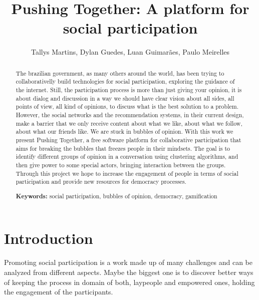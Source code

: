 \documentclass{llncs}
\begin{document}
\sloppy
\title{Pushing Together: A platform for social participation}

\author{Tallys Martins, Dylan Guedes,
        Luan Guimarães, Paulo Meirelles}


\maketitle
\begin{abstract}
  The brazilian government, as many others around the world, has been trying to
  collaborativelly build technologies for social participation, exploring
  the guidance of the internet.
  Still, the participation process is more than just giving your opinion, it is
  about dialog and discussion in a way we should have clear vision about all sides,
  all points of view, all kind of opinions, to discuss what is the best solution
  to a problem. However, the social networks and the recommendation systems, in their
  current design, make a barrier that we only receive content about
  what we like, about what we follow, about what our friends like. We are 
  stuck in bubbles of opinion.
  With this work we present Pushing Together, a free software platform
  for collaborative participation that aims for breaking the bubbles that
  freezes people in their mindsets. The goal is to identify different groups of
  opinion in a conversation using clustering algorithms, and then give power to some
  special actors, bringing interaction between the groups.
  Through this project we hope to increase the engagement of people in terms of
  social participation and provide new resources for democracy processes.

\textbf{Keywords:} social participation, bubbles of opinion, democracy, gamification
\end{abstract}

\section{Introduction}
\label{sec:intro}
  Promoting social participation is a work made up of many challenges and can be
  analyzed from different aspects. Maybe the biggest one is to discover better
  ways of keeping the process in domain of both, laypeople and empowered ones,
  holding the engagement of the participants.
\end{document}
